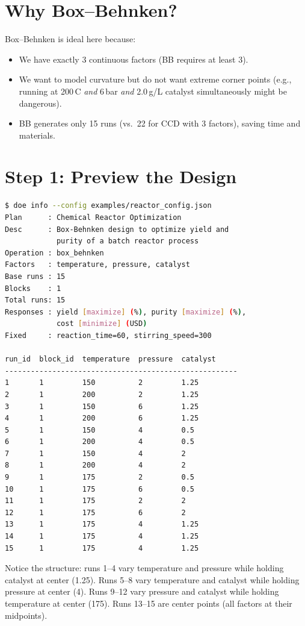 \documentclass[11pt]{book}
\begin{document}
\section{Why Box--Behnken?}

Box--Behnken is ideal here because:
\begin{itemize}
  \item We have exactly 3 continuous factors (BB requires at least 3).
  \item We want to model curvature but do not want extreme corner points (e.g., running at 200\,\textdegree C \emph{and} 6\,bar \emph{and} 2.0\,g/L catalyst simultaneously might be dangerous).
  \item BB generates only 15 runs (vs.\ 22 for CCD with 3 factors), saving time and materials.
\end{itemize}

\section{Step 1: Preview the Design}

\begin{lstlisting}[language=bash]
$ doe info --config examples/reactor_config.json
Plan      : Chemical Reactor Optimization
Desc      : Box-Behnken design to optimize yield and
            purity of a batch reactor process
Operation : box_behnken
Factors   : temperature, pressure, catalyst
Base runs : 15
Blocks    : 1
Total runs: 15
Responses : yield [maximize] (%), purity [maximize] (%),
            cost [minimize] (USD)
Fixed     : reaction_time=60, stirring_speed=300

run_id  block_id  temperature  pressure  catalyst
------------------------------------------------------
1       1         150          2         1.25
2       1         200          2         1.25
3       1         150          6         1.25
4       1         200          6         1.25
5       1         150          4         0.5
6       1         200          4         0.5
7       1         150          4         2
8       1         200          4         2
9       1         175          2         0.5
10      1         175          6         0.5
11      1         175          2         2
12      1         175          6         2
13      1         175          4         1.25
14      1         175          4         1.25
15      1         175          4         1.25
\end{lstlisting}

Notice the structure: runs 1--4 vary temperature and pressure while holding catalyst at center (1.25). Runs 5--8 vary temperature and catalyst while holding pressure at center (4). Runs 9--12 vary pressure and catalyst while holding temperature at center (175). Runs 13--15 are center points (all factors at their midpoints).
\end{document}

